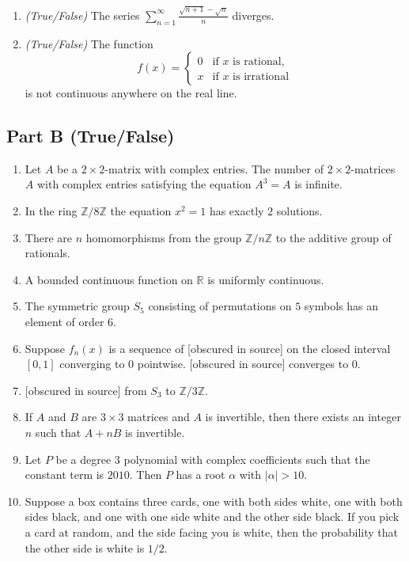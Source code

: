 \documentclass[11pt, a4paper]{article}
\begin{document}
\begin{enumerate}
  \item \emph{(True/False)} The series $\displaystyle \sum_{n=1}^\infty \frac{\sqrt{n+1} - \sqrt{n}}{n}$ diverges.
  \item \emph{(True/False)} The function
  \[
    f(x) = \begin{cases} 0 & \text{if } x \text{ is rational,} \\ x & \text{if } x \text{ is irrational} \end{cases}
  \]
  is not continuous anywhere on the real line.
\end{enumerate}

\subsection*{Part B (True/False)}
\begin{enumerate}
  \item Let $A$ be a $2 \times 2$-matrix with complex entries. The number of $2 \times 2$-matrices $A$ with complex entries satisfying the equation $A^3 = A$ is infinite.
  \item In the ring $\mathbb{Z}/8\mathbb{Z}$ the equation $x^2 = 1$ has exactly $2$ solutions.
  \item There are $n$ homomorphisms from the group $\mathbb{Z}/n\mathbb{Z}$ to the additive group of rationals.
  \item A bounded continuous function on $\mathbb{R}$ is uniformly continuous.
  \item The symmetric group $S_5$ consisting of permutations on $5$ symbols has an element of order $6$.
  \item Suppose $f_n(x)$ is a sequence of {[obscured in source]} on the closed interval $[0, 1]$ converging to $0$ pointwise. {[obscured in source]} converges to $0$.
  \item {[obscured in source]} from $S_3$ to $\mathbb{Z}/3\mathbb{Z}$.
  \item If $A$ and $B$ are $3 \times 3$ matrices and $A$ is invertible, then there exists an integer $n$ such that $A + nB$ is invertible.
  \item Let $P$ be a degree $3$ polynomial with complex coefficients such that the constant term is $2010$. Then $P$ has a root $\alpha$ with $|\alpha| > 10$.
  \item Suppose a box contains three cards, one with both sides white, one with both sides black, and one with one side white and the other side black. If you pick a card at random, and the side facing you is white, then the probability that the other side is white is $1/2$.

\end{enumerate}
\end{document}
